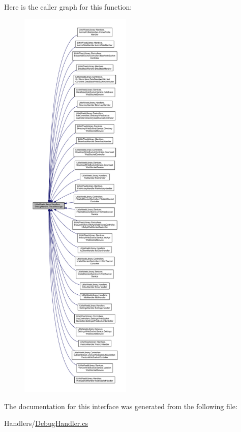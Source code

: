 Here is the caller graph for this function\+:\nopagebreak
\begin{figure}[H]
\begin{center}
\leavevmode
\includegraphics[height=550pt]{interface_little_weeb_library_1_1_handlers_1_1_i_debug_handler_a2e405bc3492e683cd3702fae125221bc_icgraph}
\end{center}
\end{figure}


The documentation for this interface was generated from the following file\+:\begin{DoxyCompactItemize}
\item 
Handlers/\mbox{\hyperlink{_debug_handler_8cs}{Debug\+Handler.\+cs}}\end{DoxyCompactItemize}
